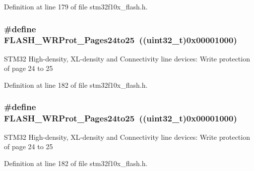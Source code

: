 Definition at line 179 of file stm32f10x\+\_\+flash.\+h.

\subsubsection[{\texorpdfstring{F\+L\+A\+S\+H\+\_\+\+W\+R\+Prot\+\_\+\+Pages24to25}{FLASH_WRProt_Pages24to25}}]{\setlength{\rightskip}{0pt plus 5cm}\#define F\+L\+A\+S\+H\+\_\+\+W\+R\+Prot\+\_\+\+Pages24to25~(({\bf uint32\+\_\+t})0x00001000)}\hypertarget{group___option___bytes___write___protection_gac36c4a402c77b28f46451e97dc3632f7}{}\label{group___option___bytes___write___protection_gac36c4a402c77b28f46451e97dc3632f7}
S\+T\+M32 High-\/density, X\+L-\/density and Connectivity line devices\+: Write protection of page 24 to 25 

Definition at line 182 of file stm32f10x\+\_\+flash.\+h.

\subsubsection[{\texorpdfstring{F\+L\+A\+S\+H\+\_\+\+W\+R\+Prot\+\_\+\+Pages24to25}{FLASH_WRProt_Pages24to25}}]{\setlength{\rightskip}{0pt plus 5cm}\#define F\+L\+A\+S\+H\+\_\+\+W\+R\+Prot\+\_\+\+Pages24to25~(({\bf uint32\+\_\+t})0x00001000)}\hypertarget{group___option___bytes___write___protection_gac36c4a402c77b28f46451e97dc3632f7}{}\label{group___option___bytes___write___protection_gac36c4a402c77b28f46451e97dc3632f7}
S\+T\+M32 High-\/density, X\+L-\/density and Connectivity line devices\+: Write protection of page 24 to 25 

Definition at line 182 of file stm32f10x\+\_\+flash.\+h.


